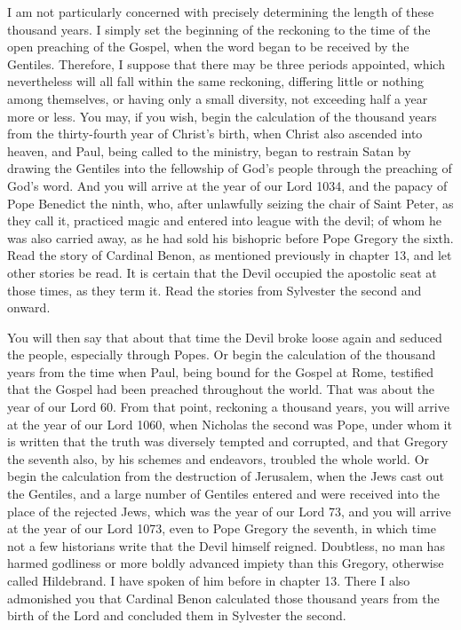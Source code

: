 I am not particularly concerned with precisely determining the length of these thousand years. I simply set the beginning of the reckoning to the time of the open preaching of the Gospel, when the word began to be received by the Gentiles. Therefore, I suppose that there may be three periods appointed, which nevertheless will all fall within the same reckoning, differing little or nothing among themselves, or having only a small diversity, not exceeding half a year more or less. You may, if you wish, begin the calculation of the thousand years from the thirty-fourth year of Christ’s birth, when Christ also ascended into heaven, and Paul, being called to the ministry, began to restrain Satan by drawing the Gentiles into the fellowship of God’s people through the preaching of God’s word. And you will arrive at the year of our Lord 1034, and the papacy of Pope Benedict the ninth, who, after unlawfully seizing the chair of Saint Peter, as they call it, practiced magic and entered into league with the devil; of whom he was also carried away, as he had sold his bishopric before Pope Gregory the sixth. Read the story of Cardinal Benon, as mentioned previously in chapter 13, and let other stories be read. It is certain that the Devil occupied the apostolic seat at those times, as they term it. Read the stories from Sylvester the second and onward.

You will then say that about that time the Devil broke loose again and seduced the people, especially through Popes. Or begin the calculation of the thousand years from the time when Paul, being bound for the Gospel at Rome, testified that the Gospel had been preached throughout the world. That was about the year of our Lord 60. From that point, reckoning a thousand years, you will arrive at the year of our Lord 1060, when Nicholas the second was Pope, under whom it is written that the truth was diversely tempted and corrupted, and that Gregory the seventh also, by his schemes and endeavors, troubled the whole world. Or begin the calculation from the destruction of Jerusalem, when the Jews cast out the Gentiles, and a large number of Gentiles entered and were received into the place of the rejected Jews, which was the year of our Lord 73, and you will arrive at the year of our Lord 1073, even to Pope Gregory the seventh, in which time not a few historians write that the Devil himself reigned. Doubtless, no man has harmed godliness or more boldly advanced impiety than this Gregory, otherwise called Hildebrand. I have spoken of him before in chapter 13. There I also admonished you that Cardinal Benon calculated those thousand years from the birth of the Lord and concluded them in Sylvester the second.

